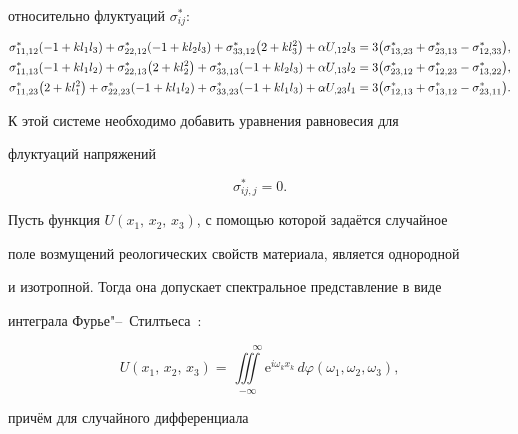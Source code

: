 относительно флуктуаций $\sigma_{ij}^*$:

\begin{align}

\sigma_{11,12}^*(-1+kl_1l_3)+\sigma_{22,12}^*(-1+kl_2l_3)+\sigma_{33,12}^*\big(2+kl_3^2\big)+\alpha

U_{,12}l_3&=3\big(\sigma_{13,23}^*+\sigma_{23,13}^*-\sigma_{12,33}^*\big),\notag\\

\sigma_{11,13}^*(-1+kl_1l_2)+\sigma_{22,13}^*\big(2+kl_2^2\big)+\sigma_{33,13}^*(-1+kl_2l_3)+\alpha

U_{,13}l_2&=3\big(\sigma_{23,12}^*+\sigma_{12,23}^*-\sigma_{13,22}^*\big),\label{Zabelin:eq:07}\\

\sigma_{11,23}^*\big(2+kl_1^2\big)+\sigma_{22,23}^*(-1+kl_1l_2)+\sigma_{33,23}^*(-1+kl_1l_3)+\alpha

U_{,23}l_1&=3\big(\sigma_{12,13}^*+\sigma_{13,12}^*-\sigma_{23,11}^*\big).\notag

\end{align}



К этой системе необходимо добавить уравнения равновесия для

флуктуаций напряжений

\begin{equation}\label{Zabelin:eq:08}

\sigma_{ij,j}^*=0.

\end{equation}



Пусть функция $U(x_1,\, x_2,\, x_3)$, с помощью которой задаётся случайное

поле возмущений реологических свойств материала, является однородной

и изотропной. Тогда она допускает спектральное представление в виде

интеграла Фурье"--~Стилтьеса~\cite{Zabelin:bib:07}: 

\begin{equation}\label{Zabelin:eq:09}

U(x_1,\, x_2,\, x_3)=\iiint\limits_{-\infty}^{\phantom{--}\infty}\mathrm{e}^{i\omega_k

x_k}\,d\varphi(\omega_1,\omega_2,\omega_3),

\end{equation}

причём для случайного дифференциала


